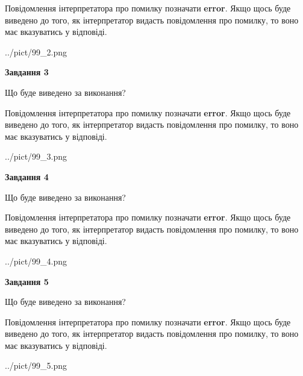 \documentclass[12pt, ukrainian]{article}
\begin{document}
{\begin {large}
Повідомлення інтерпретатора про помилку позначати \textbf{error}.
Якщо щось буде виведено до того, як інтерпретатор видасть повідомлення про помилку, 
то воно має вказуватись у відповіді. \par


\begin{center}
	{../pict/99_2.png}
\end{center}
\newpage

{\begin {center}\textbf{Завдання 3}\end {center}}\par
Що буде виведено за виконання?

Повідомлення інтерпретатора про помилку позначати \textbf{error}.
Якщо щось буде виведено до того, як інтерпретатор видасть повідомлення про помилку, 
то воно має вказуватись у відповіді. \par


\begin{center}
	{../pict/99_3.png}
\end{center}
\newpage

{\begin {center}\textbf{Завдання 4}\end {center}}\par
Що буде виведено за виконання?

Повідомлення інтерпретатора про помилку позначати \textbf{error}.
Якщо щось буде виведено до того, як інтерпретатор видасть повідомлення про помилку, 
то воно має вказуватись у відповіді. \par


\begin{center}
	{../pict/99_4.png}
\end{center}
\newpage

{\begin {center}\textbf{Завдання 5}\end {center}}\par
Що буде виведено за виконання?

Повідомлення інтерпретатора про помилку позначати \textbf{error}.
Якщо щось буде виведено до того, як інтерпретатор видасть повідомлення про помилку, 
то воно має вказуватись у відповіді. \par


\begin{center}
	{../pict/99_5.png}
\end{center}
\newpage


\end{large}}
\end{document}
